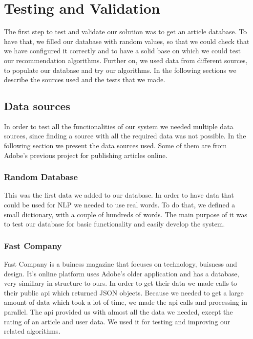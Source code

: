 \chapter{Testing and Validation}
\label{chapter:testing-validation}

The first step to test and validate our solution was to get an article database. To have that, we filled our database with random values, so that we could check that we have configured it correctly and to have a solid base on which we could test our recommendation algorithms.
Further on, we used data from different sources, to populate our database and try our algorithms.
In the following sections we describe the sources used and the tests that we made.

\section{Data sources} 
\label{sec:testing-and-validation-data-sources}
In order to test all the functionalities of our system we needed multiple data sources, since finding a source with all the required data was not possible.
In the following section we present the data sources used. Some of them are from Adobe's previous project for publishing articles online.

\subsection{Random Database} 
\label{sec:testing-and-validation-data-sources-random-database}
This was the first data we added to our database.
In order to have data that could be used for NLP we needed to use real words. To do that, we defined a small dictionary, with a couple of hundreds of words.
The main purpose of it was to test our database for basic functionality and easily develop the system.

\subsection{Fast Company} 
\label{sec:testing-and-validation-data-sources-fast-company}
Fast Company is a buiness magazine that focuses on technology, buisness and design. It's online platform uses Adobe's older application and has a database, very simillary in structure to ours.
In order to get their data we made calls to their public api which returned JSON objects. Because we needed to get a large amount of data which took a lot of time, we made the api calls and processing in parallel. The api provided us with almost all the data we needed, except the rating of an article and user data. We used it for testing and improving our related algorithms.

